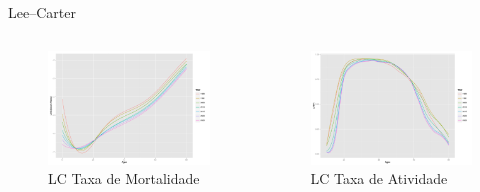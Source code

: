 \documentclass{beamer}
\begin{document}
\begin{frame}{Lee--Carter}
	\begin{columns}[c]
	\column{6cm}
	\begin{figure}
		\caption{LC Taxa de Mortalidade}
		\includegraphics[width=\textwidth]{Graphs/DR_select.pdf}
	\end{figure}
	\column{6cm}
	\begin{figure}
		\caption{LC Taxa de Atividade}
		\includegraphics[width=\textwidth]{Graphs/LFPR_select.pdf}
	\end{figure}
	\end{columns}  
\end{frame}
\end{document}
